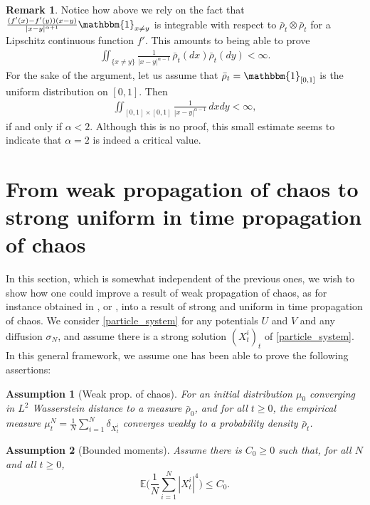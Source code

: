 \documentclass[10pt]{amsart}
\let\mathds\mathbbm
\theoremstyle{plain}
\newtheorem{assumption}{Assumption}
\theoremstyle{definition}
\newtheorem{remark}{Remark}[section]
\begin{document}
\begin{remark}
Notice how above we rely on the fact that $\frac{(f'(x)-f'(y))(x-y)}{|x-y|^{\alpha+1}}\mathds{1}_{x\neq y}$ is integrable with respect to $\bar{\rho}_t\otimes\bar{\rho}_t$ for a Lipschitz continuous function $f'$. This amounts to being able to prove
\begin{align*}
\iint_{\{x\neq y\}}\frac{1}{|x-y|^{\alpha-1}}\,\bar{\rho}_t(dx)\bar{\rho}_t(dy)<\infty.
\end{align*}
For the sake of the argument, let us assume that $\bar{\rho}_t=\mathds{1}_{[0,1]}$ is the uniform distribution on $[0,1]$. Then
\begin{align*}
\iint_{[0,1]\times[0,1]}\frac{1}{|x-y|^{\alpha-1}}\,dxdy<\infty,
\end{align*}
if and only if $\alpha<2$. Although this is no proof, this small estimate seems to indicate that $\alpha=2$ is indeed a critical value.
\end{remark}

\section{From weak propagation of chaos to strong uniform in time propagation of chaos}\label{sec_from_weak_to_strong}

In this section, which is somewhat independent of the previous ones, we wish to show how one could improve a result of weak propagation of chaos, as for instance obtained in \cite{Rogers_Shi}, \cite{cepa_lepingle} or \cite{Li_Li_Xie}, into a result of strong and uniform in time propagation of chaos. We consider \eqref{particle_system} for any potentials $U$ and $V$ and any diffusion $\sigma_N$, and assume there is a strong solution $(X^i_t)_t$ of \eqref{particle_system}. In this general framework, we assume one has been able to prove the following assertions:

\begin{assumption}[Weak prop. of chaos]\label{Hyp_weak_prop}
For an initial distribution $\mu_0$ converging in $L^2$ Wasserstein distance to a measure $\bar{\rho}_0$, and for all $t\geq0$, the empirical measure ${\mu^N_t=\frac{1}{N}\sum_{i=1}^N\delta_{X^i_t}}$ converges weakly to a probability density $\bar{\rho}_t$.
\end{assumption}

\begin{assumption}[Bounded moments]\label{Hyp_bounded_moments}
Assume there is $C_0\geq0$ such that, for all $N$ and all $t\geq0$,
\[
\mathbb{E}\biggl(\frac{1}{N}\sum_{i=1}^N|X^i_t|^{4}\biggr)\leq C_0.
\]
\end{assumption}
\end{document}
